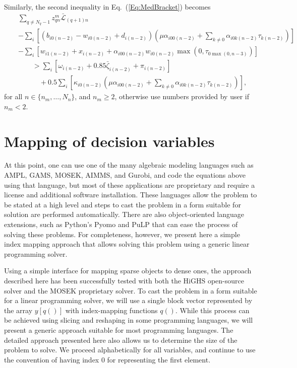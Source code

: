 \documentclass{report}[fleqn,11pt]
\begin{document}
	Similarly, the second inequality in Eq.~(\ref{Eq:MedBracket}) becomes
	\begin{eqnarray}
		\label{Eq:Med2}
		&& \sum_{q\neq N_q - 1} z_{qn}^m \bar{\mathcal{L}}_{(q+1)n} \nonumber\\
		&& - \sum_{i} \left[(b_{i0(n-2)} - w_{i0(n-2)} + d_{i(n-2)})
		\left(
		\mu\alpha_{i00(n-2)}
		+ \sum_{k\neq 0} \alpha_{i0k(n-2)}\tau_{k(n-2)}
		\right)\right]
		\nonumber\\
		&& - \sum_i \left[w_{i1(n-2)} + x_{i(n-2)}
		  + \alpha_{i00(n-2)}w_{i0(n-2)}\max(0, \tau_{0\max(0, n-3)})\right] \nonumber\\
		&& \qquad > \sum_i [\omega_{i(n-2)} + 0.85\bar{\zeta}_{i(n-2)} + \pi_{i(n-2)} ] \nonumber\\
		&& \qquad \quad + 0.5 \sum_{i} \left[\kappa_{i0(n-2)}
		\left(
		\mu\alpha_{i00(n-2)} + 
		\sum_{k\neq 0}
		\alpha_{i0k(n-2)}\tau_{k(n-2)}\right)\right],
	\end{eqnarray}
	for all $n \in \{n_m, \ldots, N_n\}$, and $n_m \ge 2$,
	otherwise use numbers provided by user if $n_m < 2$.

\chapter{Mapping of decision variables}
At this point, one can use one of the many algebraic modeling languages
such as AMPL, GAMS, MOSEK, AIMMS, and Gurobi, and code the equations above
using that language, but most of these applications are
proprietary and require a license and additional software installation.
These languages allow the problem to be stated at a high level and
steps to cast the problem in a form suitable for solution are performed automatically.
There are also object-oriented language extensions, such as Python's Pyomo
and PuLP that can ease the process of solving these problems.
For completeness, however, we present here a simple
index mapping approach that allows solving this problem using a generic
linear programming solver.

Using a simple interface for mapping sparse objects to dense ones, the approach described here
has been successfully tested with both the HiGHS open-source solver
and the MOSEK proprietary solver.
To cast the problem in a form suitable for a linear programming solver, we will use
a single block vector represented by the array $y[q()]$ with index-mapping functions $q()$.
While this process can be achieved using slicing and reshaping in some programming
languages, we will present a generic approach suitable for most programming languages.
The detailed approach presented here also allows us to determine the size of the problem to solve.
We proceed alphabetically for all variables, and continue to use the convention of having
index 0 for representing the first element.
\end{document}
